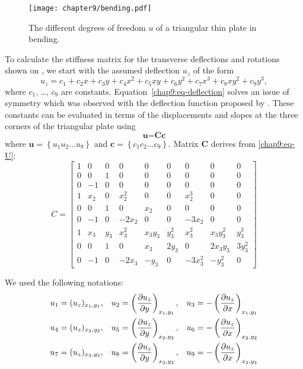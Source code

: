 \begin{figure}
\centering
\texttt{[image: chapter9/bending.pdf]}
\caption {The different degrees of freedom $u$ of a triangular thin plate in bending.}
\label{chap9:fig-triangle}
\end{figure}
%
To calculate the stiffness matrix for the transverse deflections and rotations shown on , we start with the assumed deflection $u_z$ of the form
\begin{equation}
 u_z = c_1 + c_2x + c_3y + c_4x^2 + c_5xy + c_6y^2 + c_7x^3 + c_8xy^2 + c_9y^3,
\label{chap9:eq-deflection}
\end{equation} 
where $c_1$, \ldots , $c_9$ are constants. Equation~\ref{chap9:eq-deflection} solves an issue of symmetry which was observed with the deflection function proposed by \cite{Przemieniecki85}. These constants can be evaluated in terms of the displacements and slopes at the three corners of the triangular plate using 
\begin{equation}
\textbf{u} = \textbf{Cc}
\label{chap9:eq-U}
\end{equation} 
where $\textbf{u} = \left\{u_1 u_2 \ldots u_9 \right\} $ and $\textbf{c} = \left\{c_1 c_2 \ldots c_9 \right\} $. Matrix $\textbf{C}$ derives from \eqref{chap9:eq-U}:
\begin{equation}
C = 
	\begin{bmatrix}
	1 & 0 & 0 & 0 & 0 & 0 & 0 & 0 & 0 \\
 	0 & 0 & 1 & 0 & 0 & 0 & 0 & 0 & 0 \\
	0 & -1 & 0 & 0 & 0 & 0 & 0 & 0 & 0 \\
	1 & x_2 & 0 & x_2^2 & 0 & 0 & x_2^3 & 0 & 0 \\
	0 & 0 & 1 & 0 & x_2 & 0 & 0 & 0 & 0 \\
	0 & -1 & 0 & -2x_2 & 0 & 0 & -3x_2 & 0 & 0 \\
	1 & x_3 & y_3 & x_3^2 & x_3y_3 & y_3^2 & x_3^2 & x_3y_3^2& y_3^3 \\
	0 & 0 & 1 & 0 & x_3 & 2y_3 & 0 & 2x_3y_3 & 3y_3^2 \\
	0 & -1 & 0 & -2x_3 & -y_3 & 0 & -3x_3^2 & -y_3^2 & 0
	\end{bmatrix}
\end{equation} 

We used the following notations:
\begin{align}
u_1 &= (u_z)_{x_1,y_1}, & u_2 &= \left(\frac{\partial u_z}{\partial y}\right)_{x_1,y_1}, & u_3 &= - \left(\frac{\partial u_z}{\partial x}\right)_{x_1,y_1} \notag \\
u_4 &= (u_z)_{x_2,y_2}, & u_5 &= \left(\frac{\partial u_z}{\partial y}\right)_{x_2,y_2}, & u_6 &= - \left(\frac{\partial u_z}{\partial x}\right)_{x_2,y_2} \label{chap9:ui} \\
u_7 &= (u_z)_{x_3,y_3}, & u_8 &= \left(\frac{\partial u_z}{\partial y}\right)_{x_3,y_3}, & u_9 &= - \left(\frac{\partial u_z}{\partial x}\right)_{x_3,y_3} \notag \\
\end{align} 

